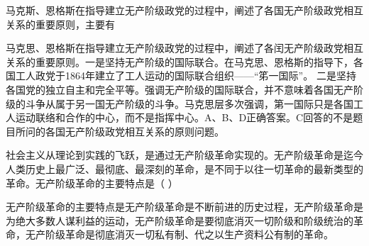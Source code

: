 \question 马克斯、恩格斯在指导建立无产阶级政党的过程中，阐述了各国无产阶级政党相互关系的重要原则，主要有
\par{}
\begin{solution}马克思、恩格斯在指导建立无产阶级政党的过程中，阐述了各闰无产阶级政党相互关系的重要原则。一是坚持无产阶级的国际联合。在马克思、恩格斯的指导下，各国工人政党于1864年建立了工人运动的国际联合组织------``笫一国际''。
二是坚持各国党的独立自主和完全平等。强调无产阶级的国际联合，并不意味着各国无产阶级的斗争从属于另一国无产阶级的斗争。马克思层多次强调，第一国际只是各国工人运动联络和合作的中心，而不是指挥中心。A、B、D正确答案。C回答的不是题目所问的各国无产阶级政党相互关系的原则问题。
\end{solution}
\question 社会主义从理论到实践的飞跃，是通过无产阶级革命实现的。无产阶级革命是迄今人类历史上最广泛、最彻底、最深刻的革命，是不同于以往一切革命的最新类型的革命。无产阶级革命的主要特点是（
）
\par\fourch{\textcolor{red}{无产阶级革命是不断前进的历史过程}}{\textcolor{red}{无产阶级革命是为绝大多数人谋利益的运动}}{\textcolor{red}{无产阶级革命是要彻底消灭一切阶级和阶级统治的革命}}{\textcolor{red}{无产阶级革命是彻底消灭一切私有制、代之以生产资料公有制的革命}}
\begin{solution}无产阶级革命的主要特点是无产阶级革命是不断前进的历史过程，无产阶级革命是为绝大多数人谋利益的运动，无产阶级革命是要彻底消灭一切阶级和阶级统治的革命，无产阶级革命是彻底消灭一切私有制、代之以生产资料公有制的革命。
\end{solution}

